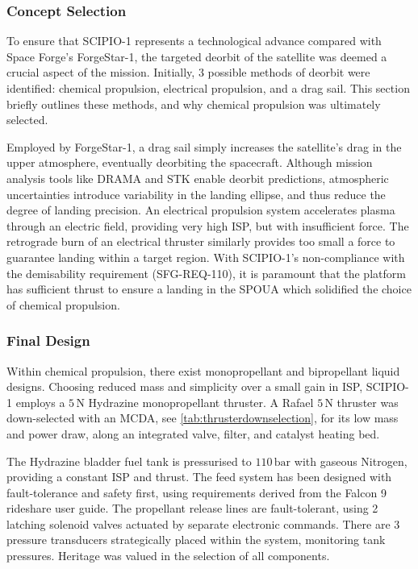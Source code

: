 \documentclass[a4paper, 11pt, conference]{IEEEtran}
\begin{document}
\subsubsection{Concept Selection}
To ensure that SCIPIO-1 represents a technological advance compared with Space Forge’s ForgeStar-1, the targeted deorbit of the satellite was deemed a crucial aspect of the mission. Initially, 3 possible methods of deorbit were identified: chemical propulsion, electrical propulsion, and a drag sail. This section briefly outlines these methods, and why chemical propulsion was ultimately selected.

Employed by ForgeStar-1, a drag sail simply increases the satellite’s drag in the upper atmosphere, eventually deorbiting the spacecraft. Although mission analysis tools like DRAMA and STK enable deorbit predictions, atmospheric uncertainties introduce variability in the landing ellipse, and thus reduce the degree of landing precision. An electrical propulsion system accelerates plasma through an electric field, providing very high ISP, but with insufficient force.  The retrograde burn of an electrical thruster similarly provides too small a force to guarantee landing within a target region. With SCIPIO-1’s non-compliance with the demisability requirement (SFG-REQ-110), it is paramount that the platform has sufficient thrust to ensure a landing in the SPOUA which solidified the choice of chemical propulsion.

\subsubsection{Final Design}
Within chemical propulsion, there exist monopropellant and bipropellant liquid designs. Choosing reduced mass and simplicity over a small gain in ISP, SCIPIO-1 employs a $5\,\mathrm{N}$ Hydrazine monopropellant thruster. A Rafael $5\,\mathrm{N}$ thruster was down-selected with an MCDA, see \autoref{tab:thrusterdownselection}, for its low mass and power draw, along an integrated valve, filter, and catalyst heating bed.

The Hydrazine bladder fuel tank is pressurised to $110\,\mathrm{bar}$ with gaseous Nitrogen, providing a constant ISP and thrust. The feed system has been designed with fault-tolerance and safety first, using requirements derived from the Falcon 9 rideshare user guide. The propellant release lines are fault-tolerant, using 2 latching solenoid valves actuated by separate electronic commands. There are 3 pressure transducers strategically placed within the system, monitoring tank pressures. Heritage was valued in the selection of all components.
\end{document}
